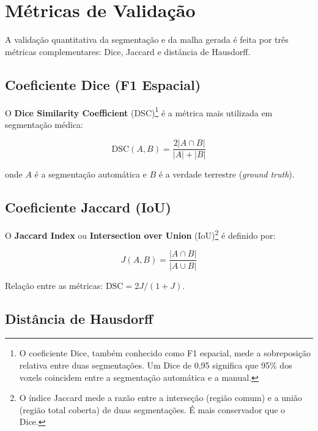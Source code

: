 \section{Métricas de Validação}
\label{sec:metricas}

A validação quantitativa da segmentação e da malha gerada é feita
por três métricas complementares: Dice, Jaccard e distância de
Hausdorff.

\subsection{Coeficiente Dice (F1 Espacial)}

O \textbf{Dice Similarity Coefficient} (DSC)\footnote{O coeficiente
Dice, também conhecido como F1 espacial, mede a sobreposição relativa
entre duas segmentações. Um Dice de 0,95 significa que 95\% dos
voxels coincidem entre a segmentação automática e a manual.} é a
métrica mais utilizada em segmentação médica:

\begin{equation}
\text{DSC}(A,B) = \frac{2|A \cap B|}{|A| + |B|}
\label{eq:dice}
\end{equation}

onde $A$ é a segmentação automática e $B$ é a verdade terrestre
(\textit{ground truth}).

\subsection{Coeficiente Jaccard (IoU)}

O \textbf{Jaccard Index} ou \textbf{Intersection over Union}
(IoU)\footnote{O índice Jaccard mede a razão entre a interseção
(região comum) e a união (região total coberta) de duas
segmentações. É mais conservador que o Dice.} é definido por:

\begin{equation}
J(A,B) = \frac{|A \cap B|}{|A \cup B|}
\label{eq:jaccard}
\end{equation}

Relação entre as métricas: $\text{DSC} = 2J/(1+J)$.

\subsection{Distância de Hausdorff}

